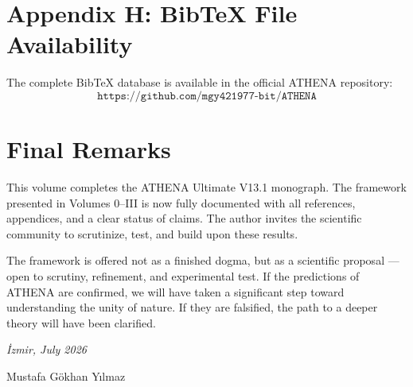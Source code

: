 \documentclass[12pt,oneside]{book}
\begin{document}
\chapter{Appendix H: BibTeX File Availability}

The complete BibTeX database is available in the official ATHENA repository:
\[
\texttt{https://github.com/mgy421977-bit/ATHENA}
\]

\chapter*{Final Remarks}

This volume completes the ATHENA Ultimate V13.1 monograph. The framework presented in Volumes 0--III is now fully documented with all references, appendices, and a clear status of claims. The author invites the scientific community to scrutinize, test, and build upon these results.

The framework is offered not as a finished dogma, but as a scientific proposal — open to scrutiny, refinement, and experimental test. If the predictions of ATHENA are confirmed, we will have taken a significant step toward understanding the unity of nature. If they are falsified, the path to a deeper theory will have been clarified.

\textit{İzmir, July 2026}

\vspace{0.5cm}
Mustafa Gökhan Yılmaz
\end{document}
